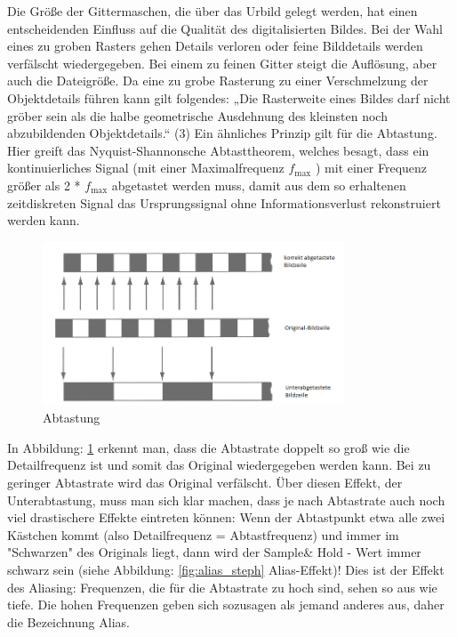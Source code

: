 Die Größe der Gittermaschen, die über das Urbild gelegt werden, hat einen entscheidenden Einfluss auf die Qualität des digitalisierten Bildes. Bei der Wahl eines zu groben Rasters gehen Details verloren oder feine Bilddetails werden verfälscht wiedergegeben. Bei einem zu feinen Gitter steigt die Auflösung, aber auch die Dateigröße. Da eine zu grobe Rasterung zu einer Verschmelzung der Objektdetails führen kann gilt folgendes:
„Die Rasterweite eines Bildes darf nicht gröber sein als die halbe geometrische Ausdehnung des kleinsten noch abzubildenden Objektdetails.“ (3)
Ein ähnliches Prinzip gilt für die Abtastung. Hier greift das Nyquist-Shannonsche Abtasttheorem, welches besagt, dass ein kontinuierliches Signal (mit einer Maximalfrequenz $ f_{\mathrm{max}} $ ) mit einer Frequenz größer als 2 * $ f_{\mathrm{max}} $ abgetastet werden muss, damit aus dem so erhaltenen zeitdiskreten Signal das Ursprungssignal ohne Informationsverlust rekonstruiert werden kann. 

\begin{figure}[h]
	\centering
		\includegraphics[width=0.8\textwidth]{img/abtastung_steph.png}
	\caption[Abtastung]{Abtastung}
	\label{fig:abtastung2_steph}
\end{figure}

In Abbildung: \ref{fig:abtastung2_steph} erkennt man, dass die Abtastrate doppelt so groß wie die Detailfrequenz ist und somit das Original wiedergegeben werden kann. Bei zu geringer Abtastrate wird das Original verfälscht. Über diesen Effekt, der Unterabtastung, muss man sich klar machen, dass je nach Abtastrate auch noch viel drastischere Effekte eintreten können: Wenn der Abtastpunkt etwa alle zwei Kästchen kommt (also Detailfrequenz = Abtastfrequenz) und immer im "Schwarzen" des Originals liegt, dann wird der Sample\& Hold -
Wert immer schwarz sein (siehe Abbildung: \ref{fig:alias_steph} Alias-Effekt)! Dies ist der Effekt des Aliasing: Frequenzen, die für die Abtastrate zu hoch sind, sehen so aus wie tiefe. Die hohen Frequenzen geben sich sozusagen als jemand anderes aus, daher die Bezeichnung Alias. 


